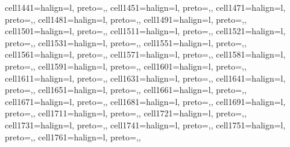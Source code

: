 \begin{table}
\begin{talltblr}
{cell{144}{1}={}{halign=l, preto={\hspace{1em}},},
cell{145}{1}={}{halign=l, preto={\hspace{1em}},},
cell{147}{1}={}{halign=l, preto={\hspace{1em}},},
cell{148}{1}={}{halign=l, preto={\hspace{1em}},},
cell{149}{1}={}{halign=l, preto={\hspace{1em}},},
cell{150}{1}={}{halign=l, preto={\hspace{1em}},},
cell{151}{1}={}{halign=l, preto={\hspace{1em}},},
cell{152}{1}={}{halign=l, preto={\hspace{1em}},},
cell{153}{1}={}{halign=l, preto={\hspace{1em}},},
cell{155}{1}={}{halign=l, preto={\hspace{1em}},},
cell{156}{1}={}{halign=l, preto={\hspace{1em}},},
cell{157}{1}={}{halign=l, preto={\hspace{1em}},},
cell{158}{1}={}{halign=l, preto={\hspace{1em}},},
cell{159}{1}={}{halign=l, preto={\hspace{1em}},},
cell{160}{1}={}{halign=l, preto={\hspace{1em}},},
cell{161}{1}={}{halign=l, preto={\hspace{1em}},},
cell{163}{1}={}{halign=l, preto={\hspace{1em}},},
cell{164}{1}={}{halign=l, preto={\hspace{1em}},},
cell{165}{1}={}{halign=l, preto={\hspace{1em}},},
cell{166}{1}={}{halign=l, preto={\hspace{1em}},},
cell{167}{1}={}{halign=l, preto={\hspace{1em}},},
cell{168}{1}={}{halign=l, preto={\hspace{1em}},},
cell{169}{1}={}{halign=l, preto={\hspace{1em}},},
cell{171}{1}={}{halign=l, preto={\hspace{1em}},},
cell{172}{1}={}{halign=l, preto={\hspace{1em}},},
cell{173}{1}={}{halign=l, preto={\hspace{1em}},},
cell{174}{1}={}{halign=l, preto={\hspace{1em}},},
cell{175}{1}={}{halign=l, preto={\hspace{1em}},},
cell{176}{1}={}{halign=l, preto={\hspace{1em}},},
}
\end{talltblr}
\end{table}
